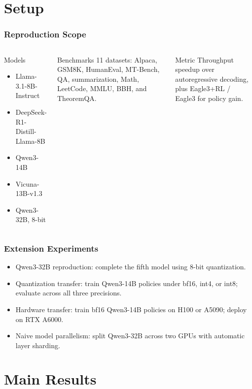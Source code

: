 \documentclass[10pt]{beamer}
\begin{document}
\section{Setup}

\begin{frame}
  \frametitle{Reproduction Scope}
  \begin{columns}[T]
    \begin{block}{Models}
      \begin{itemize}
        \item Llama-3.1-8B-Instruct
        \item DeepSeek-R1-Distill-Llama-8B
        \item Qwen3-14B
        \item Vicuna-13B-v1.3
        \item Qwen3-32B, 8-bit
      \end{itemize}
    \end{block}
    \begin{block}{Benchmarks}
      11 datasets: Alpaca, GSM8K, HumanEval, MT-Bench, QA, summarization, Math, LeetCode, MMLU, BBH, and TheoremQA.
    \end{block}
    \begin{block}{Metric}
      Throughput speedup over autoregressive decoding, plus Eagle3+RL / Eagle3 for policy gain.
    \end{block}
  \end{columns}
\end{frame}

\begin{frame}
  \frametitle{Extension Experiments}
  \begin{itemize}
    \item \alert{Qwen3-32B reproduction}: complete the fifth model using 8-bit quantization.
    \item \alert{Quantization transfer}: train Qwen3-14B policies under bf16, int4, or int8; evaluate across all three precisions.
    \item \alert{Hardware transfer}: train bf16 Qwen3-14B policies on H100 or A5090; deploy on RTX A6000.
    \item \alert{Naive model parallelism}: split Qwen3-32B across two GPUs with automatic layer sharding.
  \end{itemize}
\end{frame}

\section{Main Results}
\end{document}
